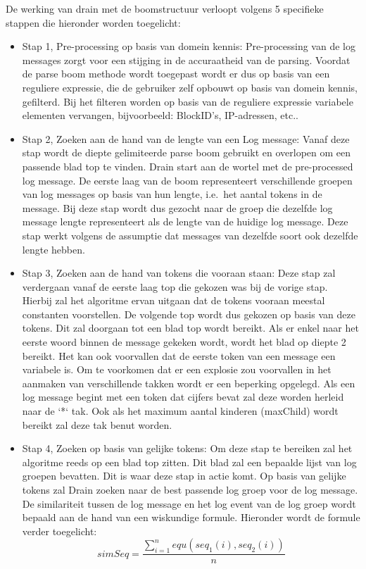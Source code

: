 De werking van drain met de boomstructuur verloopt volgens 5 specifieke stappen die hieronder worden toegelicht:
\begin{itemize}
    \item Stap 1, Pre-processing op basis van domein kennis: Pre-processing van de log messages zorgt voor een stijging in de accuraatheid van de parsing. Voordat de parse boom methode wordt toegepast wordt er dus op basis van een reguliere expressie, die de gebruiker zelf opbouwt op basis van domein kennis, gefilterd. Bij het filteren worden op basis van de reguliere expressie variabele elementen vervangen, bijvoorbeeld: BlockID's, IP-adressen, etc.. \\
    
    \item Stap 2, Zoeken aan de hand van de lengte van een Log message:
    Vanaf deze stap wordt de diepte gelimiteerde parse boom gebruikt en overlopen om een passende blad top te vinden. Drain start aan de wortel met de pre-processed log message. De eerste laag van de boom representeert verschillende groepen van log messages op basis van hun lengte, i.e.\ het aantal tokens in de message. Bij deze stap wordt dus gezocht naar de groep die dezelfde log message lengte representeert als de lengte van de huidige log message. Deze stap werkt volgens de assumptie dat messages van dezelfde soort ook dezelfde lengte hebben. \\
    
    \item Stap 3, Zoeken aan de hand van tokens die vooraan staan: 
    Deze stap zal verdergaan vanaf de eerste laag top die gekozen was bij de vorige stap. Hierbij zal het algoritme ervan uitgaan dat de tokens vooraan meestal constanten voorstellen. De volgende top wordt dus gekozen op basis van deze tokens. Dit zal doorgaan tot een blad top wordt bereikt. Als er enkel naar het eerste woord binnen de message gekeken wordt, wordt het blad op diepte 2 bereikt. Het kan ook voorvallen dat de eerste token van een message een variabele is. Om
    te voorkomen dat er een explosie zou voorvallen in het aanmaken van verschillende takken wordt er een beperking opgelegd. Als een log message begint met een token dat cijfers bevat zal deze worden herleid naar de `*` tak. Ook als het maximum aantal kinderen (maxChild) wordt bereikt zal deze tak benut worden. \\
    \item Stap 4, Zoeken op basis van gelijke tokens:
    Om deze stap te bereiken zal het algoritme reeds op een blad top zitten. Dit blad zal een bepaalde lijst van log groepen bevatten. Dit is waar deze stap in actie komt. Op basis van gelijke tokens zal Drain zoeken naar de best passende log groep voor de log message. De similariteit tussen de log message en het log event van de log groep wordt bepaald aan de hand van een wiskundige formule. Hieronder wordt de formule verder toegelicht:\\
    \[ simSeq = \frac{\sum_{i=1}^{n}equ(seq_{1}(i), seq_{2}(i))}{n} \]


\end{itemize}
